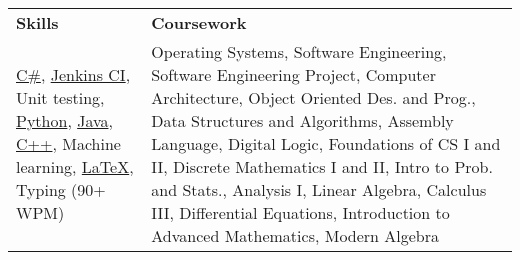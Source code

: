 \documentclass[letterpaper, 10pt]{article}
\begin{document}
\begin{tabularx}{\textwidth}{p{}p{}}
    \textbf{Skills} & \textbf{Coursework}\\
        
        \href{https://en.wikipedia.org/wiki/C_Sharp_(programming_language)}{C\#},
        \href{https://jenkins.io/}{Jenkins CI},
        \newline
        Unit testing,
        \href{https://www.python.org/}{Python},
        \href{https://en.wikipedia.org/wiki/Java_(programming_language)}{Java},
        \href{https://en.wikipedia.org/wiki/C\%2B\%2B}{C++},
        Machine learning,
        \href{https://www.latex-project.org/}{\LaTeX},
        \newline Typing (90+ WPM)
        
        &
        Operating Systems,
        Software Engineering,
        Software Engineering Project,
        Computer Architecture,
        Object Oriented Des. and Prog.,
        Data Structures and Algorithms,
        Assembly Language,
        Digital Logic,
        Foundations of CS I and II,
        Discrete Mathematics I and II,
        Intro to Prob. and Stats.,
        Analysis I,
        Linear Algebra,
        Calculus III,
        Differential Equations,
        Introduction to Advanced Mathematics,
        Modern Algebra
        
\end{tabularx}

\setlength{\tabcolsep}{16pt}

\vspace{-8pt}














\end{document}
